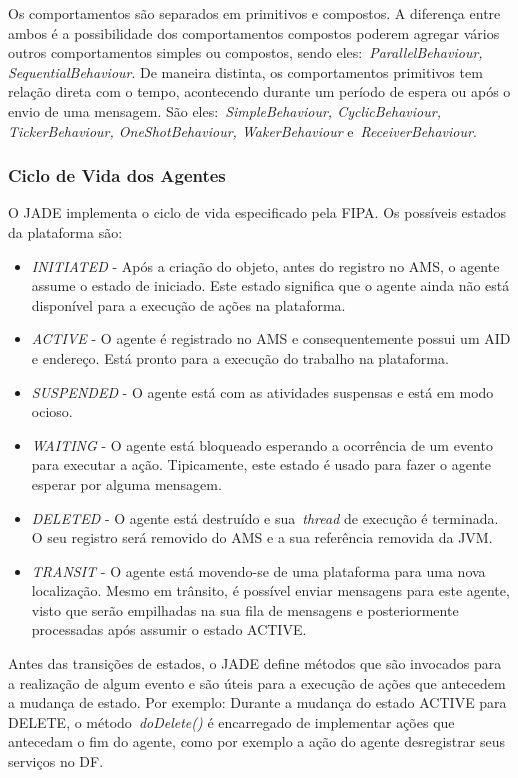 Os comportamentos são separados em primitivos e compostos. A diferença entre ambos é a possibilidade dos comportamentos compostos poderem agregar vários outros comportamentos simples ou compostos, sendo eles:~\emph{ParallelBehaviour, SequentialBehaviour}. De maneira distinta, os comportamentos primitivos tem relação direta com o tempo, acontecendo durante um período de espera ou após o envio de uma mensagem. São eles:~\emph{SimpleBehaviour, CyclicBehaviour, TickerBehaviour, OneShotBehaviour, WakerBehaviour} e~\emph{ReceiverBehaviour}.

\subsubsection{Ciclo de Vida dos Agentes}
O JADE implementa o ciclo de vida especificado pela FIPA. Os possíveis estados da plataforma são:

\begin{itemize}
	\item \emph{INITIATED} - Após a criação do objeto, antes do registro no AMS, o agente assume o estado de iniciado. Este estado significa que o agente ainda não está disponível para a execução de ações na  plataforma.
	\item \emph{ACTIVE} - O agente é registrado no AMS e consequentemente possui um AID e endereço. Está pronto para a execução do trabalho na plataforma.
	\item \emph{SUSPENDED} - O agente está com as atividades suspensas e está em modo ocioso.
	\item \emph{WAITING} - O agente está bloqueado esperando a ocorrência de um evento para executar a ação. Tipicamente, este estado é usado para fazer o agente esperar por alguma mensagem.
	\item \emph{DELETED} - O agente está destruído e sua~\emph{thread} de execução é terminada. O seu registro será removido do AMS e a sua referência removida da JVM.
	\item \emph{TRANSIT} - O agente está movendo-se de uma plataforma para uma nova localização. Mesmo em trânsito, é possível enviar mensagens para este agente, visto que serão empilhadas na sua fila de mensagens e posteriormente processadas após assumir o estado ACTIVE.
\end{itemize}

Antes das transições de estados, o JADE define métodos que são invocados para a realização de algum evento e são úteis para a execução de ações que antecedem a mudança de estado. Por exemplo: Durante a mudança do estado ACTIVE para DELETE, o método~\emph{doDelete()} é encarregado de implementar ações que antecedam o fim do agente, como por exemplo a ação do agente desregistrar seus serviços no DF.

